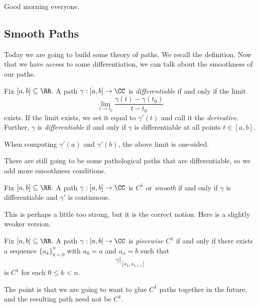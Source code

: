 
Good morning everyone.

\subsection{Smooth Paths}
Today we are going to build some theory of paths. We recall the definition.
\pathdef*
\noindent Now that we have access to some differentiation, we can talk about the smoothness of our paths.
\begin{definition}
	Fix $[a,b]\subseteq\RR$. A path $\gamma:[a,b]\to\CC$ is \textit{differentiable} if and only if the limit
	\[\lim_{t\to t_0}\frac{\gamma(t)-\gamma(t_0)}{t-t_0}\]
	exists. If the limit exists, we set it equal to $\gamma'(t)$ and call it the \textit{derivative}. Further, $\gamma$ is \textit{differentiable} if and only if $\gamma$ is differentiable at all points $t\in[a,b]$.
\end{definition}
\begin{remark}
	When computing $\gamma'(a)$ and $\gamma'(b)$, the above limit is one-sided.
\end{remark}
There are still going to be some pathological paths that are differentiable, so we add more smoothness conditions.
\begin{defihelper}[\texorpdfstring{$C^1$}{C1}] 
	Fix $[a,b]\subseteq\RR$. A path $\gamma:[a,b]\to\CC$ is \textit{$C^1$} or \textit{smooth} if and only if $\gamma$ is differentiable and $\gamma'$ is continuous.
\end{defihelper}
This is perhaps a little too strong, but it is the correct notion. Here is a slightly weaker version.
\begin{definition}
	Fix $[a,b]\subseteq\RR$. A path $\gamma:[a,b]\to\CC$ is \textit{piecewise $C^1$} if and only if there exists a sequence $\{a_k\}_{k=0}^n$ with $a_0=a$ and $a_n=b$ such that
	\[\gamma|_{[a_k,a_{k+1}]}\]
	is $C^1$ for each $0\le k<n$.
\end{definition}
The point is that we are going to want to glue $C^1$ paths together in the future, and the resulting path need not be $C^1$.

